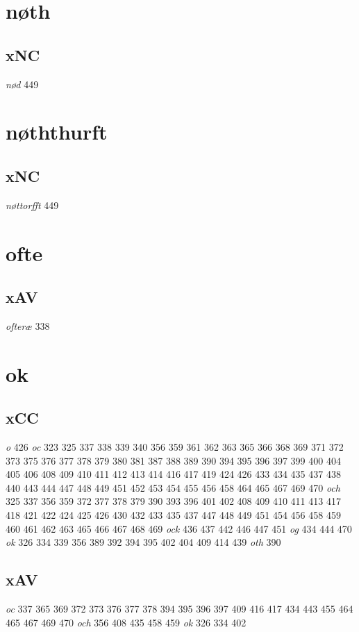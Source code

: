 \documentclass[a4paper,twocolumn]{article}
\begin{document}
\section{nøth}
\label{sec:org25ca43a}
\subsection{xNC}
\label{sec:orgdd12e79}
\emph{nød} 449 
\section{nøththurft}
\label{sec:org49490c8}
\subsection{xNC}
\label{sec:org7990f6f}
\emph{nøttorfft} 449 
\section{ofte}
\label{sec:org2e5542a}
\subsection{xAV}
\label{sec:orgf5d9990}
\emph{ofteræ} 338 
\section{ok}
\label{sec:org6173103}
\subsection{xCC}
\label{sec:org16fabfd}
\emph{o} 426 \emph{oc} 323 325 337 338 339 340 356 359 361 362 363 365 366 368 369 371 372 373 375 376 377 378 379 380 381 387 388 389 390 394 395 396 397 399 400 404 405 406 408 409 410 411 412 413 414 416 417 419 424 426 433 434 435 437 438 440 443 444 447 448 449 451 452 453 454 455 456 458 464 465 467 469 470 \emph{och} 325 337 356 359 372 377 378 379 390 393 396 401 402 408 409 410 411 413 417 418 421 422 424 425 426 430 432 433 435 437 447 448 449 451 454 456 458 459 460 461 462 463 465 466 467 468 469 \emph{ock} 436 437 442 446 447 451 \emph{og} 434 444 470 \emph{ok} 326 334 339 356 389 392 394 395 402 404 409 414 439 \emph{oth} 390 
\subsection{xAV}
\label{sec:org85dabb8}
\emph{oc} 337 365 369 372 373 376 377 378 394 395 396 397 409 416 417 434 443 455 464 465 467 469 470 \emph{och} 356 408 435 458 459 \emph{ok} 326 334 402 
\end{document}
